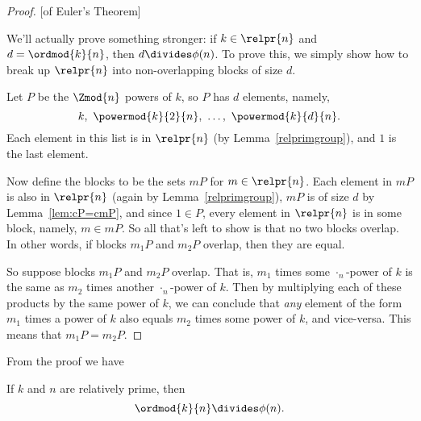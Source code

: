 \begin{proof}{}[of Euler's Theorem]

We'll actually prove something stronger: if $k \in \relpr{n}$ and $d =
\ordmod{k}{n}$, then $d \divides \phi(n)$.  To prove this, we simply
show how to break up $\relpr{n}$ into non-overlapping blocks of size
$d$.

Let $P$ be the $\Zmod{n}$ powers of $k$, so $P$ has $d$
elements, namely,
\[
k,\ \powermod{k}{2}{n},\ \dots,\ \powermod{k}{d}{n}.
\]
Each element in this list is in $\relpr{n}$ (by
Lemma~\ref{relprimgroup}), and $1$ is the last element.

Now define the blocks to be the sets $m P$ for $m \in \relpr{n}$.
Each element in $mP$ is also in $\relpr{n}$ (again by
Lemma~\ref{relprimgroup}), $mP$ is of size $d$ by
Lemma~\ref{lem:cP=cmP}, and since $1 \in P$, every element in
$\relpr{n}$ is in some block, namely, $m \in mP$.  So all that's left
to show is that no two blocks overlap.  In other words, if blocks
$m_1P$ and $m_2P$ overlap, then they are equal.

So suppose blocks $m_1P$ and $m_2P$ overlap.  That is, $m_1$ times
some $\cdot_n$-power of $k$ is the same as $m_2$ times another
$\cdot_n$-power of $k$.  Then by multiplying each of these products by
the same power of $k$, we can conclude that \emph{any} element of the
form $m_1$ times a power of $k$ also equals $m_2$ times some power of
$k$, and vice-versa.  This means that $m_1P = m_2P$.

\end{proof}

From the proof we have
\begin{corollary}
If $k$ and $n$ are relatively prime, then
\[
\ordmod{k}{n} \divides \phi(n).
\]
\end{corollary}

